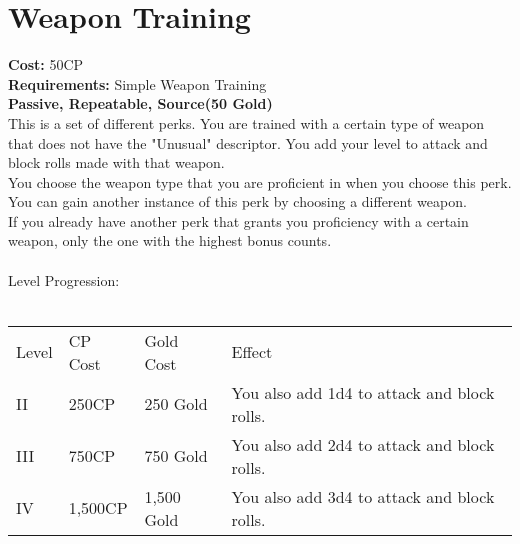 \section{Weapon Training}\label{perk:weaponTraining}
\textbf{Cost:} 50CP\\
\textbf{Requirements:} Simple Weapon Training\\
\textbf{Passive, Repeatable, Source(50 Gold)}\\
This is a set of different perks.
You are trained with a certain type of weapon that does not have the "Unusual" descriptor.
You add your level to attack and block rolls made with that weapon.\\
You choose the weapon type that you are proficient in when you choose this perk.
You can gain another instance of this perk by choosing a different weapon.\\
If you already have another perk that grants you proficiency with a certain weapon, only the one with the highest bonus counts.\\
\\
Level Progression:\\
\\
\begin{tabular}{l | l | l | l}
	Level & CP Cost & Gold Cost & Effect\\
	II & 250CP & 250 Gold & You also add 1d4 to attack and block rolls.\\
	III & 750CP & 750 Gold & You also add 2d4 to attack and block rolls.\\
	IV & 1,500CP & 1,500 Gold & You also add 3d4 to attack and block rolls.\\
\end{tabular}